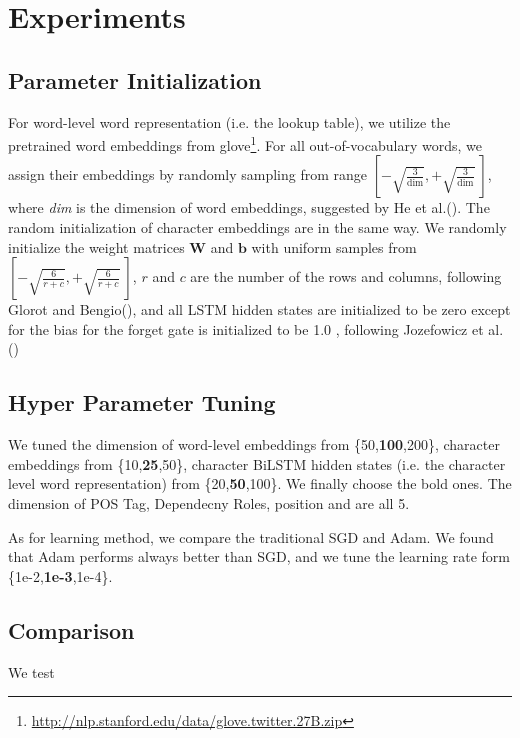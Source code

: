 \section{Experiments}
\label{sec:eval}

\subsection{Parameter Initialization}
For word-level word representation (i.e. the lookup table), 
we utilize the pretrained word embeddings from glove\footnote{\url{http://nlp.stanford.edu/data/glove.twitter.27B.zip}}.
For all out-of-vocabulary words, we assign their embeddings by randomly sampling from range $\left[-\sqrt{\frac{3}{\text{dim}}}, +\sqrt{\frac{3}{\text{dim}}}~\right]$, where \textit{dim} is the dimension of word embeddings, suggested by He et al.(\citeyear{DBLP:conf/iccv/HeZRS15}). The random initialization of character embeddings are in the same way.
We randomly initialize the weight matrices $\mathbf{W}$ and $\mathbf{b}$ with uniform samples from 
$\left[-\sqrt{\frac{6}{r+c}}, +\sqrt{\frac{6}{r+c}}~\right]$, 
$r$ and $c$ are the number of the rows and columns, following Glorot and Bengio(\citeyear{DBLP:journals/jmlr/GlorotB10}), and all LSTM hidden states are initialized to be zero except for the bias for the forget gate is initialized to be 1.0 , following Jozefowicz et al.(\citeyear{DBLP:conf/icml/JozefowiczZS15}) 


\subsection{Hyper Parameter Tuning}
We tuned the dimension of word-level embeddings from \{50,\textbf{100},200\}, character embeddings from \{10,\textbf{25},50\}, character BiLSTM hidden states (i.e. the character level word representation)  from  \{20,\textbf{50},100\}. 
We finally choose the bold ones.
The dimension of POS Tag, Dependecny Roles, position and  are all 5.

As for learning method, we compare the traditional SGD and Adam.
We found that Adam performs always better than SGD, and we tune the learning rate form \{1e-2,\textbf{1e-3},1e-4\}.

\subsection{Comparison} 
We test 
